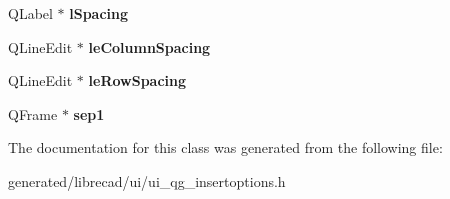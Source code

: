\begin{DoxyCompactItemize}
\item 
\hypertarget{classUi__QG__InsertOptions_aefbdda67397b2b370a39b477879844e4}{Q\-Label $\ast$ {\bfseries l\-Spacing}}\label{classUi__QG__InsertOptions_aefbdda67397b2b370a39b477879844e4}

\item 
\hypertarget{classUi__QG__InsertOptions_a6ad6b8b0cffe2500afcd36eaf94436dd}{Q\-Line\-Edit $\ast$ {\bfseries le\-Column\-Spacing}}\label{classUi__QG__InsertOptions_a6ad6b8b0cffe2500afcd36eaf94436dd}

\item 
\hypertarget{classUi__QG__InsertOptions_a4d9078c806d08f83b38faa5350aa27a1}{Q\-Line\-Edit $\ast$ {\bfseries le\-Row\-Spacing}}\label{classUi__QG__InsertOptions_a4d9078c806d08f83b38faa5350aa27a1}

\item 
\hypertarget{classUi__QG__InsertOptions_a1062a0080c629ff5076cbf6a3d4d0253}{Q\-Frame $\ast$ {\bfseries sep1}}\label{classUi__QG__InsertOptions_a1062a0080c629ff5076cbf6a3d4d0253}

\end{DoxyCompactItemize}


The documentation for this class was generated from the following file\-:\begin{DoxyCompactItemize}
\item 
generated/librecad/ui/ui\-\_\-qg\-\_\-insertoptions.\-h\end{DoxyCompactItemize}
